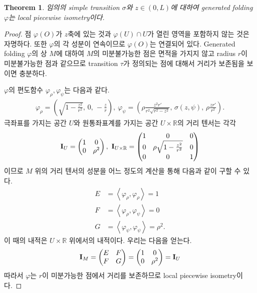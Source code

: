 \documentclass{amsart}
\theoremstyle{plain}
\newtheorem{theorem}{Theorem}[section]
\theoremstyle{definition}
\theoremstyle{remark}
\begin{document}
\begin{theorem}\label{iso}%
임의의 simple transition $\sigma$와 $z\in(0,L)$에 대하여 generated folding $\varphi$는 local piecewise isometry이다.
\end{theorem}

\begin{proof}
점 $\varphi(O)$가 $z$축에 있는 것과 $\varphi(U)\cap U$가 열린 영역을 포함하지 않는 것은 자명하다.
또한 $\varphi$의 각 성분이 연속이므로 $\varphi(O)$는 연결되어 있다.
Generated folding $\varphi$의 상 $M$에 대하여 $M$의 미분불가능한 점은 면적을 가지지 않고 radius $r$이 미분불가능한 점과 같으므로 transition $\tau$가 정의되는 점에 대해서 거리가 보존됨을 보이면 충분하다.

$\varphi$의 편도함수 $\varphi_{\rho},\varphi_{\psi}$는 다음과 같다.
\begin{align*}
\varphi_{\rho}=\left(\sqrt{1-\frac{z^2}{r^2}},\,0,\,-\frac{z}r\right),\ 
\varphi_{\psi}=\left(\rho\frac{z^2r'}{r^2\sqrt{r^2-z^2}},\,\sigma(z,\psi),\,\rho\frac{zr'}{r^2}\right).
\end{align*}
극좌표를 가지는 공간 $U$와 원통좌표계를 가지는 공간 $U\times{\mathbb R}$의 거리 텐서는 각각
\begin{align*}
{\bold I}_{U}=\begin{pmatrix}1&0\\0&\rho^2\end{pmatrix},\ 
{\bold I}_{U\times{\mathbb R}}=\begin{pmatrix}1&0&0\\0&\rho\sqrt{1-\frac{z^2}{r^2}}&0\\0&0&1\end{pmatrix}
\end{align*}
이므로 $M$ 위의 거리 텐서의 성분을 어느 정도의 계산을 통해 다음과 같이 구할 수 있다.
\begin{align*}
E&=\left\langle\varphi_{\rho},\varphi_{\rho}\right\rangle=1\\
F&=\left\langle\varphi_{\rho},\varphi_{\psi}\right\rangle=0\\
G&=\left\langle\varphi_{\psi},\varphi_{\psi}\right\rangle=\rho^2.
\end{align*}
이 때의 내적은 $U\times{\mathbb R}$ 위에서의 내적이다. 우리는 다음을 얻는다.
\begin{align*}
{\bold I}_M=\begin{pmatrix}E&F\\F&G\end{pmatrix}=\begin{pmatrix}1&0\\0&\rho^2\end{pmatrix}={\bold I}_U
\end{align*}
따라서 $\varphi$는 $r$이 미분가능한 점에서 거리를 보존하므로 local piecewise isometry이다.
\end{proof}
\end{document}
